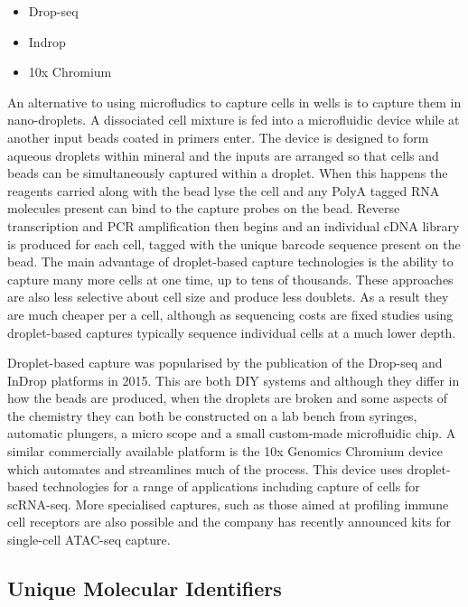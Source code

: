 \documentclass[11pt,a4paper,titlepage,twoside,openright]{style/unimelbthesis}
\theoremstyle{definition}
\theoremstyle{definition}
\theoremstyle{definition}
\theoremstyle{remark}
\begin{document}
\begin{mainmatter}
\begin{itemize}
\tightlist
\item
  Drop-seq
\item
  Indrop
\item
  10x Chromium
\end{itemize}

An alternative to using microfludics to capture cells in wells is to capture them in nano-droplets. A dissociated cell mixture is fed into a microfluidic device while at another input beads coated in primers enter. The device is designed to form aqueous droplets within mineral and the inputs are arranged so that cells and beads can be simultaneously captured within a droplet. When this happens the reagents carried along with the bead lyse the cell and any PolyA tagged RNA molecules present can bind to the capture probes on the bead. Reverse transcription and PCR amplification then begins and an individual cDNA library is produced for each cell, tagged with the unique barcode sequence present on the bead. The main advantage of droplet-based capture technologies is the ability to capture many more cells at one time, up to tens of thousands. These approaches are also less selective about cell size and produce less doublets. As a result they are much cheaper per a cell, although as sequencing costs are fixed studies using droplet-based captures typically sequence individual cells at a much lower depth.

Droplet-based capture was popularised by the publication of the Drop-seq and InDrop platforms in 2015. This are both DIY systems and although they differ in how the beads are produced, when the droplets are broken and some aspects of the chemistry they can both be constructed on a lab bench from syringes, automatic plungers, a micro scope and a small custom-made microfluidic chip. A similar commercially available platform is the 10x Genomics Chromium device which automates and streamlines much of the process. This device uses droplet-based technologies for a range of applications including capture of cells for scRNA-seq. More specialised captures, such as those aimed at profiling immune cell receptors are also possible and the company has recently announced kits for single-cell ATAC-seq capture.

\hypertarget{unique-molecular-identifiers}{%
\subsection{Unique Molecular Identifiers}\label{unique-molecular-identifiers}}


\end{mainmatter}
\end{document}
